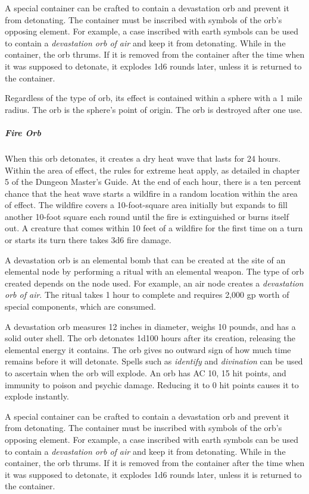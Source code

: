 \documentclass[10pt,a4paper,twoside,bg=print,twocolumn,openany,nodeprecatedcode]{dndbook}
\begin{document}
A special container can be crafted to contain a devastation orb and prevent it from detonating. The container must be inscribed with symbols of the orb's opposing element. For example, a case inscribed with earth symbols can be used to contain a \textit{devastation orb of air} and keep it from detonating. While in the container, the orb thrums. If it is removed from the container after the time when it was supposed to detonate, it explodes 1d6 rounds later, unless it is returned to the container.

Regardless of the type of orb, its effect is contained within a sphere with a 1 mile radius. The orb is the sphere's point of origin. The orb is destroyed after one use.

\subparagraph{Fire Orb}
When this orb detonates, it creates a dry heat wave that lasts for 24 hours. Within the area of effect, the rules for extreme heat apply, as detailed in chapter 5 of the Dungeon Master's Guide. At the end of each hour, there is a ten percent chance that the heat wave starts a wildfire in a random location within the area of effect. The wildfire covers a 10-foot-square area initially but expands to fill another 10-foot square each round until the fire is extinguished or burns itself out. A creature that comes within 10 feet of a wildfire for the first time on a turn or starts its turn there takes 3d6 fire damage.

A devastation orb is an elemental bomb that can be created at the site of an elemental node by performing a ritual with an elemental weapon. The type of orb created depends on the node used. For example, an air node creates a \textit{devastation orb of air}. The ritual takes 1 hour to complete and requires 2,000 gp worth of special components, which are consumed.

A devastation orb measures 12 inches in diameter, weighs 10 pounds, and has a solid outer shell. The orb detonates 1d100 hours after its creation, releasing the elemental energy it contains. The orb gives no outward sign of how much time remains before it will detonate. Spells such as \textit{identify} and \textit{divination} can be used to ascertain when the orb will explode. An orb has AC 10, 15 hit points, and immunity to poison and psychic damage. Reducing it to 0 hit points causes it to explode instantly.

A special container can be crafted to contain a devastation orb and prevent it from detonating. The container must be inscribed with symbols of the orb's opposing element. For example, a case inscribed with earth symbols can be used to contain a \textit{devastation orb of air} and keep it from detonating. While in the container, the orb thrums. If it is removed from the container after the time when it was supposed to detonate, it explodes 1d6 rounds later, unless it is returned to the container.
\end{document}
